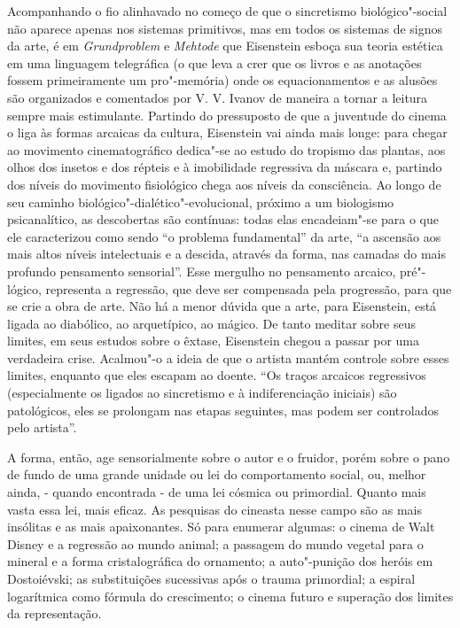 Acompanhando o fio alinhavado no começo de que o sincretismo
biológico"-social não aparece apenas nos sistemas primitivos, mas em
todos os sistemas de signos da arte, é em \emph{Grundproblem} e
\emph{Mehtode} que Eisenstein esboça sua teoria estética em uma
linguagem telegráfica (o que leva a crer que os livros e as anotações
fossem primeiramente um pro"-memória) onde os equacionamentos e as
alusões são organizados e comentados por V. V. Ivanov de maneira a tornar
a leitura sempre mais estimulante. Partindo do pressuposto de que a
juventude do cinema o liga às formas arcaicas da cultura, Eisenstein vai
ainda mais longe: para chegar ao movimento cinematográfico dedica"-se ao
estudo do tropismo das plantas, aos olhos dos insetos e dos répteis e à
imobilidade regressiva da máscara e, partindo dos níveis do movimento
fisiológico chega aos níveis da consciência. Ao longo de seu caminho
biológico"-dialético"-evolucional, próximo a um biologismo psicanalítico,
as descobertas são contínuas: todas elas encadeiam"-se para o que ele
caracterizou como sendo ``o problema fundamental'' da arte, ``a ascensão
aos mais altos níveis intelectuais e a descida, através da forma, nas
camadas do mais profundo pensamento sensorial''. Esse mergulho no
pensamento arcaico, pré"-lógico, representa a regressão, que deve ser
compensada pela progressão, para que se crie a obra de arte. Não há a
menor dúvida que a arte, para Eisenstein, está ligada ao diabólico, ao
arquetípico, ao mágico. De tanto meditar sobre seus limites, em seus
estudos sobre o êxtase, Eisenstein chegou a passar por uma verdadeira
crise. Acalmou"-o a ideia de que o artista mantém controle sobre esses
limites, enquanto que eles escapam ao doente. ``Os traços arcaicos
regressivos (especialmente os ligados ao sincretismo e à
indiferenciação iniciais) são patológicos, eles se prolongam nas etapas
seguintes, mas podem ser controlados pelo artista''.

A forma, então, age sensorialmente sobre o autor e o fruidor, porém
sobre o pano de fundo de uma grande unidade ou lei do comportamento
social, ou, melhor ainda, - quando encontrada - de uma lei cósmica ou
primordial. Quanto mais vasta essa lei, mais eficaz. As pesquisas do
cineasta nesse campo são as mais insólitas e as mais apaixonantes. Só
para enumerar algumas: o cinema de Walt Disney e a regressão ao mundo
animal; a passagem do mundo vegetal para o mineral e a forma
cristalográfica do ornamento; a auto"-punição dos heróis em Dostoiévski;
as substituições sucessivas após o trauma primordial; a espiral
logarítmica como fórmula do crescimento; o cinema futuro e superação dos
limites da representação.

